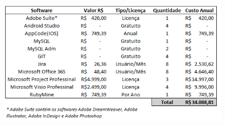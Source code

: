 \begin{figure}[!htb]
    \begin{center}
	    \includegraphics[scale=0.6]{figuras/custoSoftwares}
	\end{center}
\end{figure}

    


